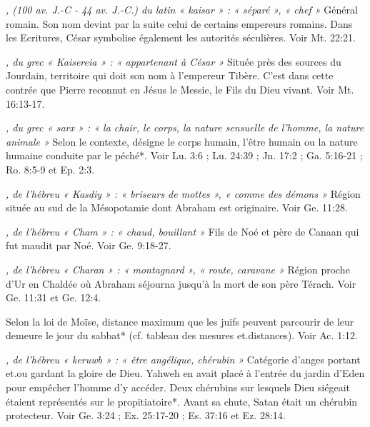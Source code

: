 \begin{multicols}{2}
\textit{, (100 av. J.-C - 44 av. J.-C.) du latin « kaisar » : « séparé », « chef »}\newline
Général romain. Son nom devint par la suite celui de certains empereurs romains. Dans les Ecritures, César symbolise également les autorités séculières. Voir Mt. 22:21.

\textit{, du grec « Kaisereia » : « appartenant à César »}\newline
Située près des sources du Jourdain, territoire qui doit son nom à l'empereur Tibère. C'est dans cette contrée que Pierre reconnut en Jésus le Messie, le Fils du Dieu vivant. Voir Mt. 16:13-17.

\textit{, du grec « sarx » : « la chair, le corps, la nature sensuelle de l'homme, la nature animale »}\newline
Selon le contexte, désigne le corps humain, l'être humain ou la nature humaine conduite par le péché*. Voir Lu. 3:6 ; Lu. 24:39 ; Jn. 17:2 ; Ga. 5:16-21 ; Ro. 8:5-9 et Ep. 2:3.

\textit{, de l'hébreu « Kasdiy » : « briseurs de mottes », « comme des démons »}\newline
Région située au sud de la Mésopotamie dont Abraham est originaire. Voir Ge. 11:28.

\textit{, de l'hébreu « Cham » : « chaud, bouillant »}\newline
Fils de Noé et père de Canaan qui fut maudit par Noé. Voir Ge. 9:18-27.

\textit{, de l'hébreu « Charan » : « montagnard », « route, caravane »}\newline
Région proche d'Ur en Chaldée où Abraham séjourna jusqu'à la mort de son père Térach. Voir Ge. 11:31 et Ge. 12:4.

\textit{}\newline
Selon la loi de Moïse, distance maximum que les juifs peuvent parcourir de leur demeure le jour du sabbat* (cf. tableau des mesures et.distances). Voir Ac. 1:12.

\textit{, de l'hébreu « keruwb » : « être angélique, chérubin »}\newline
Catégorie d'anges portant et.ou gardant la gloire de Dieu. Yahweh en avait placé à l'entrée du jardin d'Eden pour empêcher l'homme d'y accéder. Deux chérubins sur lesquels Dieu siégeait étaient représentés sur le propitiatoire*. Avant sa chute, Satan était un chérubin protecteur. Voir Ge. 3:24 ; Ex. 25:17-20 ; Es. 37:16 et Ez. 28:14.


\end{multicols}
